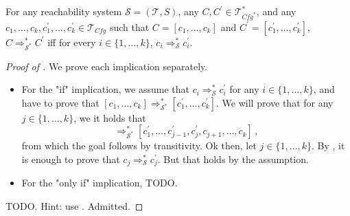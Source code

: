 \documentclass{article}
\newcommand{\Tcfg}{\mathcal{T}_{\mathit{Cfg}}}
\begin{document}
\begin{lemma}\label{lem:reachComposite}
    For any reachability system $\mathcal{S} = (\mathcal{T}, S)$, any $C,C^\prime \in \mathcal{T}^*_{\mathit{Cfg}^*}$,
    and any $c_1,\ldots,c_k,c_1^\prime,\ldots,c_k^\prime \in \Tcfg$ such that
    $C = [c_1,\ldots,c_k]$ and $C^\prime = [c_1^\prime,\ldots,c_k^\prime]$,
    $C \Rightarrow^*_{\mathcal{S}^*} C^\prime$ iff for every $i \in \{ 1, \ldots, k \}$,
    $c_i \Rightarrow^*_{\mathcal{S}} c_i^\prime$.
\end{lemma}
\begin{proof}[Proof of ]
We prove each implication separately.
\begin{itemize}
    \item For the "if" implication, we assume that $c_i \Rightarrow_{\mathcal{S}}^* c_i^\prime$
          for any $i \in \{ 1, \ldots, k \}$,
          and have to prove that $[c_1,\ldots,c_k] \Rightarrow_{\mathcal{S}^*}^* [c_1^\prime,\ldots,c_k^\prime]$.
          We will prove that for any $j \in \{ 1, \ldots, k \}$, we it holds that
          \begin{equation*}
           [c^\prime_1,\ldots,c^\prime_{j-1}, c_j, c_{j+1}, \ldots, c_k] \Rightarrow_{\mathcal{S}^*}^* [c^\prime_1,\ldots,c^\prime_{j-1}, c_j^\prime, c_{j+1}, \ldots, c_k]    \, ,
          \end{equation*}
          from which the goal follows by transitivity.
          Ok then, let $j \in \{ 1, \ldots, k \}$.
          By , it is enough to prove that $c_j \Rightarrow^*_{\mathcal{S}} c_j^\prime$.
          But that holds by the assumption.
    \item For the "only if" implication, TODO.
\end{itemize}

TODO. Hint: use .
Admitted.
\end{proof}
\end{document}
